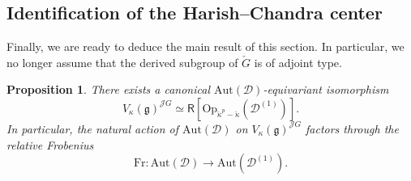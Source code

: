 \documentclass{amsart}
\newtheorem{Prop}[Thm]{Proposition}
\theoremstyle{definition}
\newcommand{\diglet}{\mathrm{F}}
\newcommand{\fg}{\mathfrak{g}}
\newcommand{\fr}{^\on{(1)}}
\newcommand{\D}{\sD}
\newcommand{\sD}{\mathscr{D}}
\newcommand{\on}{\mathrm}
\newcommand{\Ring}{\mathsf{R}}
\newcommand{\Jet}{\mathscr{J}}
\newcommand{\ckappa}{\check{\kappa}}
\newcommand{\Conn}{\on{Conn}}
\newcommand{\Aut}{\on{Aut}}
\numberwithin{equation}{section}
\begin{document}
\subsection{Identification of the Harish--Chandra center}

\label{ss:hccenD}
Finally, we are ready to deduce the main result of this section. { In particular, we no longer assume that the derived subgroup of $\check{G}$ is of adjoint type.}

\begin{Prop} \label{p:autDdisc}There exists a canonical $\Aut(\sD)$-equivariant isomorphism 
$$V_\kappa(\fg)^{\Jet G} \simeq \Ring[\on{Op}_{\ckappa^p - \ckappa}(\sD\fr)].$$In particular, the natural action of $\Aut(\sD)$ on $V_\kappa(\fg)^{\Jet G}$ factors through the relative Frobenius $$\on{Fr}: \Aut(\sD) \rightarrow \Aut(\sD\fr).$$
\end{Prop}
\end{document}
